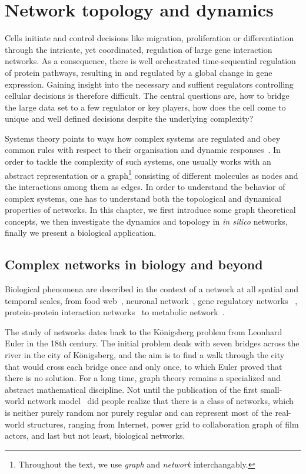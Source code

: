 \chapter{Network topology and dynamics}
\label{chap:network}

Cells initiate and control decisions like migration, proliferation or differentiation through the intricate, yet
coordinated, regulation of large gene interaction networks. 
As a consequence, there is  well orchestrated time-sequential regulation of protein pathways, resulting in and regulated by a  global change in gene expression.
Gaining insight into the necessary and suffient regulators controlling cellular decisions  is therefore difficult. 
The central questions are, how to bridge the large data set to a few regulator or key players, how does the cell come to unique and well defined decisions despite the underlying complexity?

Systems theory points to ways how complex systems are regulated and obey common rules with respect to their organisation and dynamic responses~\citep{Kauffman1993}. 
In order to tackle the complexity of such systems, 
one usually works with
an abstract
representation or a graph\footnote{Throughout the text, we use \emph{graph} and \emph{network} interchangably.} consisting of different molecules as nodes and the 
interactions among them as edges. In order to understand the
behavior of complex systems, one has to understand both
the topological and dynamical properties of networks. In this chapter, we first
introduce some graph theoretical concepts, we then investigate the dynamics and
topology in \emph{in silico} networks, finally we present a biological application.

\section{Complex networks in biology and beyond}
Biological phenomena are described in the context of a network
at all spatial and temporal scales, from food web~\citep{Williams2000}, 
neuronal network~\citep{White1986,Bullmore2009}, gene regulatory networks~%
\citep{Kauffman1969,Gama-Castro2008,Abdulrehman2011},
protein-protein interaction networks~\citep{Jeong2001,Stelzl2005}
to metabolic network~\citep{Herrgaard2008}.

The study of networks dates back to the K\"onigsberg
problem from Leonhard Euler in the 18th century. The initial
problem deals with seven bridges across the river in the city
of K\"onigsberg, and the aim is to find a walk through the 
city that would cross each bridge once and only once, to which
Euler proved that there is no solution. For a long time,
graph theory remains a specialized and abstract mathematical 
discipline. Not until the publication of the first 
small-world network model~\citep{Watts1998} did people
realize that there is a class of networks, which is neither
purely random nor purely regular and can represent most of
the real-world structures, ranging from Internet, power grid
to collaboration graph of film actors, and last but not least, 
biological networks.

